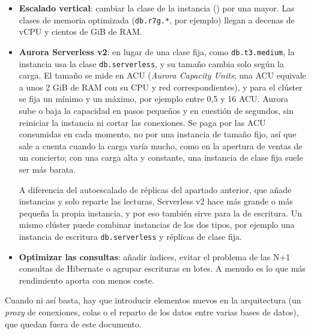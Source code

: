 \documentclass[12pt,a4paper]{article}
\begin{document}
\begin{itemize}
    \item \textbf{Escalado vertical}: cambiar la clase de la instancia (\texttt{}) por una mayor. Las clases de memoria optimizada (\texttt{db.r7g.*}, por ejemplo) llegan a decenas de vCPU y cientos de GiB de RAM. 
    
    \item \textbf{Aurora Serverless v2}: en lugar de una clase fija, como \texttt{db.t3.medium}, la instancia usa la clase \texttt{db.serverless}, y su tamaño cambia solo según la carga. El tamaño se mide en ACU (\textit{Aurora Capacity Units}; una ACU equivale a unos 2 GiB de RAM con su CPU y red correspondientes), y para el clúster se fija un mínimo y un máximo, por ejemplo entre 0,5 y 16 ACU. Aurora sube o baja la capacidad en pasos pequeños y en cuestión de segundos, sin reiniciar la instancia ni cortar las conexiones. Se paga por las ACU consumidas en cada momento, no por una instancia de tamaño fijo, así que sale a cuenta cuando la carga varía mucho, como en la apertura de ventas de un concierto; con una carga alta y constante, una instancia de clase fija suele ser más barata.

    A diferencia del autoescalado de réplicas del apartado anterior, que añade instancias y solo reparte las lecturas, Serverless v2 hace más grande o más pequeña la propia instancia, y por eso también sirve para la de escritura. Un mismo clúster puede combinar instancias de los dos tipos, por ejemplo una instancia de escritura \texttt{db.serverless} y réplicas de clase fija.
    
    \item \textbf{Optimizar las consultas}: añadir índices, evitar el problema de las N+1 consultas de Hibernate o agrupar escrituras en lotes. A menudo es lo que más rendimiento aporta con menos coste.
\end{itemize}

Cuando ni así basta, hay que introducir elementos nuevos en la arquitectura (un \textit{proxy} de conexiones, colas o el reparto de los datos entre varias bases de datos), que quedan fuera de este documento.




\theendnotes
\end{document}
